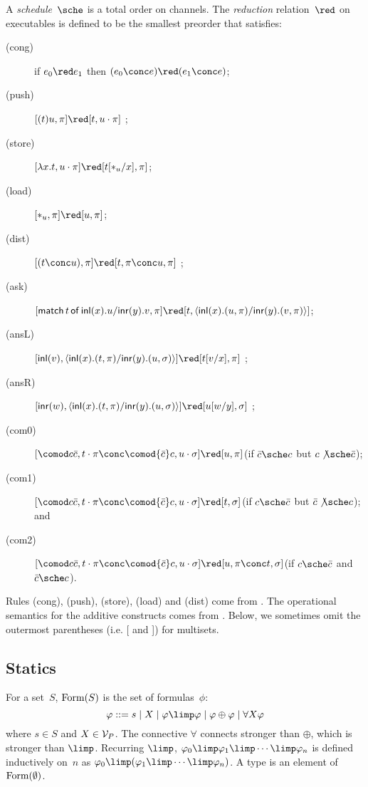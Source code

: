 A \textit{schedule}~$\sche$ is a total order on channels.
The \textit{reduction} relation~$\red$ on executables
is defined to be the smallest preorder
that satisfies:
\begin{description}
 \item[(cong)] if
      $e_0         \red e_1$
      then
      $(e_0 \conc e) \red (e_1\conc e)$\enspace;
 \item[(push)]
	    $[(t)u,\pi]      \red [t,u\cdot\pi]$      \enspace;
 \item[(store)]
	    $[\lambda x.t,u\cdot\pi]
	     \red
	     [t[\ast_u/x],      \pi]$\enspace;
 \item[(load)]
	    $[\ast_u,\pi]\red [u,\pi]$\enspace;
 \item[(dist)]
           $[(t\conc u),\pi]  \red [t,\pi\conc u,\pi]$ \enspace;
 \item[(ask)]
      $[\mat t x u y v,\pi]\red [t,\mats x u \pi y v \pi]$\enspace;
 \item[(ansL)]
           $[\inl{v}, \mats xt\pi yu\sigma] \red [t[v/x],\pi] $ \enspace;
 \item[(ansR)]
           $[\inr{w}, \mats xt\pi yu\sigma] \red [u[w/y],\sigma] $ \enspace;
 \item[(com0)]
	    $[\comod c{\co c}, t\cdot\pi\conc \comod{\co c}c,
	    u\cdot\sigma] \red
	    [u,\pi]$\enspace(if $\co c\sche c$ but $c\not\sche \co c$)\enspace;
 \item[(com1)]
	    $[\comod c{\co c}, t\cdot\pi\conc \comod{\co c}c,
	    u\cdot\sigma] \red
	    [t,\sigma]$\enspace(if $c\sche \co c$ but $\co c\not\sche c$)\enspace; and
 \item[(com2)]
	    $[\comod c{\co c}, t\cdot\pi\conc \comod{\co c}c,
	    u\cdot\sigma] \red
	    [u,\pi\conc t,\sigma]$\enspace(if $c\sche \co c$ and $\co c\sche
       c$)\enspace.
\end{description}
Rules (cong), (push), (store), (load) and (dist) come from \citet{danos-krivine}.
The operational semantics for the additive constructs comes from \citet{curien-mac}.
Below, we sometimes omit the outermost parentheses (i.e. [ and ]) for multisets.



\subsection{Statics}
For a set~$S$,
$\mathop{\text{Form}}(S)$ is the set of formulas~$\phi$:
\[
\phi::= s \mid X \mid \phi\limp\phi\mid \phi\oplus\phi\mid
\forall X \phi
\]
where $s\in S$ and $X\in \mathcal V_P$.
The connective $\forall$ connects stronger than $\oplus$, which is
stronger than $\limp$.
Recurring $\limp$,
$\phi_0\limp\phi_1\limp\cdots\limp\phi_n$ is defined inductively on~$n$
as
$\phi_0\limp(\phi_1\limp\cdots\limp\phi_n)$.
A type is an element of $\mathop{\text{Form}}(\emptyset)$.

